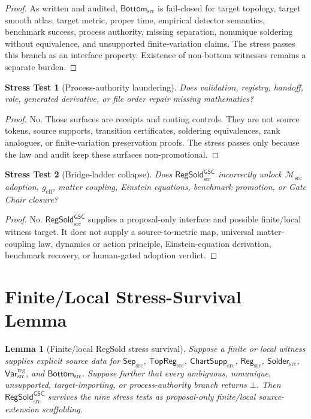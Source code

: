 \documentclass[11pt]{article}
\newcommand{\Msrc}{\mathcal{M}_{\mathrm{src}}}
\newcommand{\geff}{g_{\mathrm{eff}}}
\newcommand{\RegSold}{\mathsf{RegSold}_{\mathrm{src}}^{\mathsf{GSC}}}
\newcommand{\SepSrc}{\mathsf{Sep}_{\mathrm{src}}}
\newcommand{\TopRegSrc}{\mathsf{TopReg}_{\mathrm{src}}}
\newcommand{\ChartSuppSrc}{\mathsf{ChartSupp}_{\mathrm{src}}}
\newcommand{\RegSrc}{\mathsf{Reg}_{\mathrm{src}}}
\newcommand{\SolderSrc}{\mathsf{Solder}_{\mathrm{src}}}
\newcommand{\VarRegSrc}{\mathsf{Var}^{\mathrm{reg}}_{\mathrm{src}}}
\newcommand{\BottomSrc}{\mathsf{Bottom}_{\mathrm{src}}}
\newcommand{\Bot}{\bot}
\newtheorem{stress}{Stress Test}
\newtheorem{lemma}{Lemma}
\begin{document}
\begin{proof}
As written and audited, \(\BottomSrc\) is fail-closed for target topology,
target smooth atlas, target metric, proper time, empirical detector
semantics, benchmark success, process authority, missing separation,
nonunique soldering without equivalence, and unsupported finite-variation
claims. The stress passes this branch as an interface property. Existence of
non-bottom witnesses remains a separate burden.
\end{proof}

\begin{stress}[Process-authority laundering]
Does validation, registry, handoff, role, generated derivative, or file order
repair missing mathematics?
\end{stress}

\begin{proof}
No. Those surfaces are receipts and routing controls. They are not source
tokens, source supports, transition certificates, soldering equivalences,
rank analogues, or finite-variation preservation proofs. The stress passes
only because the law and audit keep these surfaces non-promotional.
\end{proof}

\begin{stress}[Bridge-ladder collapse]
Does \(\RegSold\) incorrectly unlock \(\Msrc\) adoption, \(\geff\), matter
coupling, Einstein equations, benchmark promotion, or Gate Chair closure?
\end{stress}

\begin{proof}
No. \(\RegSold\) supplies a proposal-only interface and possible
finite/local witness target. It does not supply a source-to-metric map,
universal matter-coupling law, dynamics or action principle, Einstein-equation
derivation, benchmark recovery, or human-gated adoption verdict.
\end{proof}

\section{Finite/Local Stress-Survival Lemma}

\begin{lemma}[Finite/local RegSold stress survival]
Suppose a finite or local witness supplies explicit source data for
\(\SepSrc\), \(\TopRegSrc\), \(\ChartSuppSrc\), \(\RegSrc\), \(\SolderSrc\),
\(\VarRegSrc\), and \(\BottomSrc\). Suppose further that every ambiguous,
nonunique, unsupported, target-importing, or process-authority branch returns
\(\Bot\). Then \(\RegSold\) survives the nine stress tests as proposal-only
finite/local source-extension scaffolding.
\end{lemma}
\end{document}
